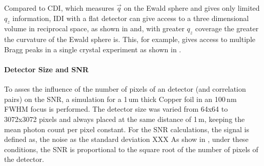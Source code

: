 	Compared to CDI, which measures $\vec{q}$ on the Ewald sphere and gives only limited $q_z$ information, IDI with a flat detector can give access  to a three dimensional volume in reciprocal space, as shown in  and, with greater $q_z$ coverage the greater the curvature of the Ewald sphere is. This, for example, gives access to multiple Bragg peaks in a single crystal experiment as shown in . 
		
	
	\paragraph{Detector Size and SNR}
	
	To asses the influence of the number of pixels of an detector (and correlation pairs) on the SNR, a simulation for a 1\,um thick Copper foil in an 100\,nm FWHM focus is performed. The detector size was varied from 64x64 to 3072x3072 pixels and always placed at the same distance of 1\,m, keeping the mean photon count per pixel constant. For the SNR calculations, the signal is defined as, the noise as the standard deviation XXX
	As show in , under these conditions, the SNR is proportional to the square root of the number of pixels of the detector.



